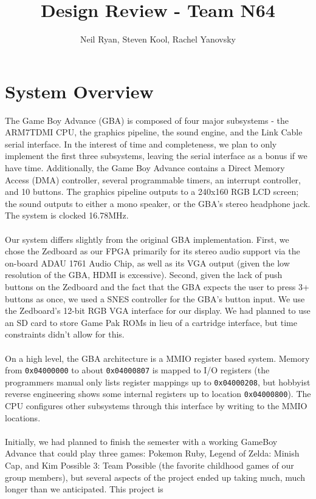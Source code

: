 \documentclass[11pt,a4paper,draft]{article}
\begin{document}
	\title{Design Review - Team N64}
	\author{Neil Ryan, Steven Kool, Rachel Yanovsky}
	\maketitle
	\newpage
	
	\section{System Overview}
	The Game Boy Advance (GBA) is composed of four major subsystems - the ARM7TDMI CPU, the graphics pipeline, the sound engine, and the Link Cable serial interface. In the interest of time and completeness, we plan to only implement the first three subsystems, leaving the serial interface as a bonus if we have time. Additionally, the Game Boy Advance contains a Direct Memory Access (DMA) controller, several programmable timers, an interrupt controller, and 10 buttons. The graphics pipeline outputs to a 240x160 RGB LCD screen; the sound outputs to either a mono speaker, or the GBA's stereo headphone jack. The system is clocked 16.78MHz.\cite{GBAManual} \\\\
	Our system differs slightly from the original GBA implementation. First, we chose the Zedboard as our FPGA primarily for its stereo audio support via the on-board ADAU 1761 Audio Chip, as well as its VGA output (given the low resolution of the GBA, HDMI is excessive). Second, given the lack of push buttons on the Zedboard and the fact that the GBA expects the user to press 3+ buttons as once, we used a SNES controller for the GBA's button input. We use the Zedboard's 12-bit RGB VGA interface for our display. We had planned to use an SD card to store Game Pak ROMs in lieu of a cartridge interface, but time constraints didn't allow for this.\\\\	
	On a high level, the GBA architecture is a MMIO register based system. Memory from \texttt{0x04000000} to about \texttt{0x04000807} is mapped to I/O registers (the programmers manual only lists register mappings up to \texttt{0x04000208}, but hobbyist reverse engineering shows some internal registers up to location \texttt{0x04000800}). The CPU configures other subsystems through this interface by writing to the MMIO locations.\\\\
	Initially, we had planned to finish the semester with a working GameBoy Advance that could play three games: Pokemon Ruby, Legend of Zelda: Minish Cap, and Kim Possible 3: Team Possible (the favorite childhood games of our group members), but several aspects of the project ended up taking much, much longer than we anticipated. This project is
	
\end{document}
